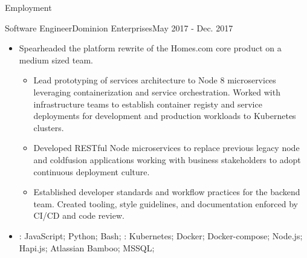 \documentclass[]{mcdowellcv}
\begin{document}
\begin{cvsection}{Employment}
        \begin{cvsubsection}{Software Engineer}{Dominion Enterprises}{May 2017 - Dec. 2017}
            \begin{itemize}
                \item Spearheaded the platform rewrite of the Homes.com core product on a medium sized team.
                \begin{itemize}
                    \item Lead prototyping of services architecture to Node 8 microservices leveraging containerization and service orchestration. Worked with infrastructure teams to establish container registy and service deployments for development and production workloads to Kubernetes clusters.
                    \item Developed RESTful Node microservices to replace previous legacy node and coldfusion applications working with business stakeholders to adopt continuous deployment culture.
                    \item Established developer standards and workflow practices for the backend team. Created tooling, style guidelines, and documentation enforced by CI/CD and code review.
                \end{itemize}
            \end{itemize}
            \begin{itemize}
                 \item {}: JavaScript; Python; Bash;  \newline
                : Kubernetes; Docker; Docker-compose; Node.js; Hapi.js; Atlassian Bamboo; MSSQL;
            \end{itemize}
        \end{cvsubsection}


\end{cvsection}
\end{document}
